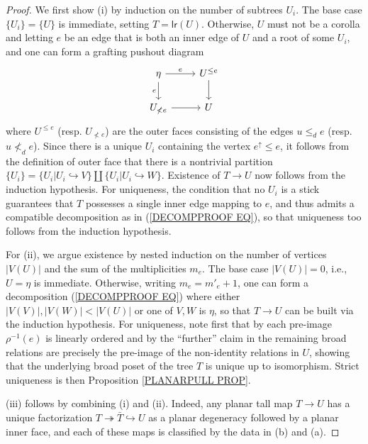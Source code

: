 \documentclass[a4paper,10pt]{article}%
\begin{document}
\begin{proof}
	We first show (i) by induction on the number of subtrees $U_i$. The base case $\{U_i\}=\{U\}$ is immediate, setting 
	$T= \mathsf{lr}(U)$. Otherwise, $U$ must not be a corolla and letting $e$ be an edge that is both an inner edge of $U$ and a root of some $U_i$, and one can form a grafting pushout diagram
\begin{equation} \label{DECOMPPROOF EQ}
\begin{tikzcd}
	\eta \ar{r}{e} \ar{d}[swap]{e} & U^{\leq e} \ar{d}
\\
	U_{\nless e} \ar{r} & U
\end{tikzcd}
\end{equation}
where $U^{\leq e}$ (resp. $U_{\nless e}$) are the outer faces consisting of the edges $u \leq_d e$ (resp. $u \nless_d e$).
Since there is a unique $U_i$ containing the vertex $e^{\uparrow} \leq e$, 
it follows from the definition of outer face that there is a
nontrivial partition 
$\{U_i\} = \{U_i|U_i \hookrightarrow V\} 
\amalg \{U_i|U_i \hookrightarrow W\}$. Existence of $T \to U$ now follows from the induction hypothesis. For uniqueness, the condition that no $U_i$ is a stick guarantees that $T$ possesses a single inner edge mapping to $e$, and thus admits a compatible decomposition as in (\ref{DECOMPPROOF EQ}), so that uniqueness too follows from the induction hypothesis.

For (ii), we argue existence by nested induction on the number of vertices $|V(U)|$ and the sum of the multiplicities $m_e$. The base case $|V(U)|=0$, i.e., $U = \eta$ is immediate. Otherwise, writing $m_e = m'_e +1$, one can form a decomposition (\ref{DECOMPPROOF EQ}) where either $|V(V)|,|V(W)|<|V(U)|$ or one of $V,W$ is $\eta$, so that $T \to U$ can be built via the induction hypothesis. For uniqueness, note first that 
by \cite[Lemma 5.33]{Pe17} each pre-image $\rho^{-1}(e)$ is linearly ordered and by the ``further'' claim in 
\cite[Cor. 5.39]{Pe17} the remaining broad relations are precisely the pre-image of the non-identity relations in $U$, showing that the underlying broad poset of the tree $T$ is unique  up to isomorphism. Strict uniqueness is then 
Proposition \ref{PLANARPULL PROP}.

(iii) follows by combining (i) and (ii). Indeed, any planar tall map $T \to U$ has a unique factorization 
$T \twoheadrightarrow \bar{T} \hookrightarrow U$
as a planar degeneracy followed by a planar inner face, and each  of these maps is classified by the data in (b) and (a).
\end{proof}
\end{document}
